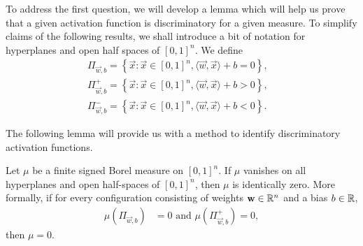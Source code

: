 To address the first question, we will develop a lemma which will help us prove that a given activation function is discriminatory for a given measure.
To simplify claims of the following results, we shall introduce a bit of notation for hyperplanes and open half spaces of $[0,1]^n$. We define
\begin{align*}
    \Pi_{\vec{w}, b} = \left \{ \vec{x} : \vec{x} \in [0,1]^n, \langle \vec{w}, \vec{x} \rangle + b = 0 \right \}, & \\
    \Pi_{\vec{w}, b}^{+} = \left \{ \vec{x} : \vec{x} \in [0,1]^n, \langle \vec{w}, \vec{x} \rangle + b > 0 \right \}, & \\
    \Pi_{\vec{w}, b}^{-} = \left \{ \vec{x} : \vec{x} \in [0,1]^n, \langle \vec{w}, \vec{x} \rangle + b < 0 \right \}.
\end{align*}

The following lemma will provide us with a method to identify discriminatory activation functions.

\begin{lemma}
\label{lemma:discrim:vanishhyper}
Let $\mu$ be a finite signed Borel measure on $[0,1]^n$. If $\mu$ vanishes on all hyperplanes and open half-spaces of $[0,1]^n$, then $\mu$ is identically zero. More formally, if for every configuration consisting of weights $\mathbf{w} \in {\mathbb R}^n$ and a bias $b \in {\mathbb R}$, \begin{align*}
    \mu (\Pi_{\vec{w}, b}) &= 0 \text{ and } \mu(\Pi_{\vec{w}, b}^{+}) = 0,
\end{align*}
then $\mu = 0$.
\end{lemma}


